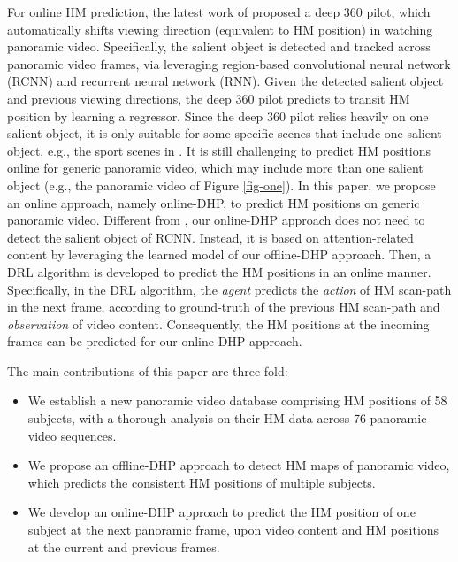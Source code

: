 \documentclass[10pt,journal,compsoc]{IEEEtran}
\begin{document}
For online HM prediction, the latest work of \cite{hu2017deep} proposed a deep 360 pilot, which automatically shifts viewing direction (equivalent to HM position) in watching panoramic video. Specifically, the salient object is detected and tracked across panoramic video frames, via leveraging region-based convolutional neural network (RCNN) \cite{ren2015faster} and recurrent neural network (RNN). Given the detected salient object and previous viewing directions, the deep 360 pilot predicts to transit HM position by learning a regressor. Since the deep 360 pilot relies heavily on one salient object, it is only suitable for some specific scenes that include one salient object, e.g., the sport scenes in \cite{hu2017deep}. It is still challenging to predict HM positions online for generic panoramic video, which may include more than one salient object (e.g., the panoramic video of Figure \ref{fig-one}). In this paper, we propose an online approach, namely online-DHP, to predict HM positions on generic panoramic video. Different from \cite{hu2017deep}, our online-DHP approach does not need to detect the salient object of RCNN. Instead, it is based on attention-related content by leveraging the learned model of our offline-DHP approach. Then, a DRL algorithm is developed to predict the HM positions in an online manner. Specifically, in the DRL algorithm, the \textit{agent} predicts the \textit{action} of HM scan-path in the next frame, according to ground-truth of the previous HM scan-path and \textit{observation} of video content. Consequently, the HM positions at the incoming frames can be predicted for our online-DHP approach.


The main contributions of this paper are three-fold:
\begin{itemize}
\item We establish a new panoramic video database comprising HM positions of 58 subjects, with a thorough analysis on their HM data across 76 panoramic video sequences.

\item We propose an offline-DHP approach to detect HM maps of panoramic video, which predicts the consistent HM positions of multiple subjects.

\item We develop an online-DHP approach to predict the HM position of one subject at the next panoramic frame, upon video content and HM positions at the current and previous frames.

\end{itemize}
\end{document}
